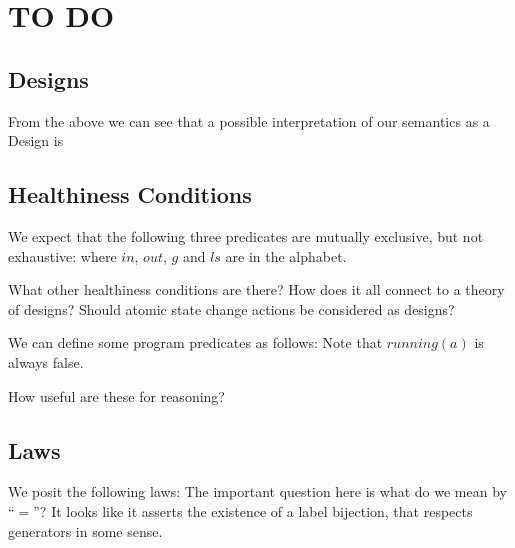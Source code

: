 \section{TO DO}\label{ha:TO-DO}


\subsection{Designs}

From the above we can see that a possible interpretation of our semantics as a
Design is

\subsection{Healthiness Conditions}

We expect that the following three predicates
are mutually exclusive, but not exhaustive:
where $in$, $out$, $g$ and $ls$ are in the alphabet.

What other healthiness conditions are there?
How does it all connect to a theory of designs?
Should atomic state change actions be considered as designs?

We can define some program predicates as follows:
Note that $running(a)$ is always false.

How useful are these for reasoning?


\subsection{Laws}

We posit the following laws:
The important question here is what do we mean by ``$=$''?
It looks like it asserts the existence of a label bijection,
that respects generators in some sense.

